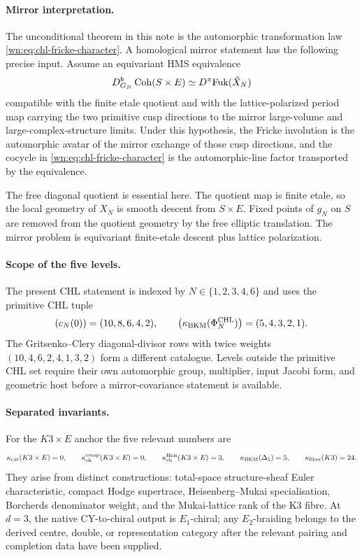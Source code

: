\paragraph{Mirror interpretation.}
The unconditional theorem in this note is the automorphic
transformation law \eqref{wn:eq:chl-fricke-character}.  A homological
mirror statement has the following precise input.  Assume an equivariant
HMS equivalence
\[
  D^b_{G_N}\operatorname{Coh}(S\times E)
  \simeq
  D^\pi\mathrm{Fuk}(\check X_N)
\]
compatible with the finite etale quotient and with the lattice-polarized
period map carrying the two primitive cusp directions to the mirror
large-volume and large-complex-structure limits.  Under this hypothesis,
the Fricke involution is the automorphic avatar of the mirror exchange
of those cusp directions, and the cocycle in
\eqref{wn:eq:chl-fricke-character} is the automorphic-line factor
transported by the equivalence.

The free diagonal quotient is essential here.  The quotient map is finite
etale, so the local geometry of \(X_N\) is smooth descent from
\(S\times E\).  Fixed points of \(g_N\) on \(S\) are removed from the
quotient geometry by the free elliptic translation.  The mirror problem
is equivariant finite-etale descent plus lattice polarization.

\paragraph{Scope of the five levels.}
The present CHL statement is indexed by \(N\in\{1,2,3,4,6\}\) and uses
the primitive CHL tuple
\[
  (c_N(0))=(10,8,6,4,2),\qquad
  \bigl(\kappa_{\mathrm{BKM}}(\Phi^{\mathrm{CHL}}_N)\bigr)=(5,4,3,2,1).
\]
The Gritsenko--Clery diagonal-divisor rows with twice weights
\((10,4,6,2,4,1,3,2)\) form a different catalogue.  Levels outside the
primitive CHL set require their own automorphic group, multiplier, input
Jacobi form, and geometric host before a mirror-covariance statement is
available.

\paragraph{Separated invariants.}
For the \(K3\times E\) anchor the five relevant numbers are
\[
  \kappa_{\mathrm{cat}}(K3\times E)=0,\qquad
  \kappa_{\mathrm{ch}}^{\mathrm{comp}}(K3\times E)=0,\qquad
  \kappa_{\mathrm{ch}}^{\mathrm{Heis}}(K3\times E)=3,\qquad
  \kappa_{\mathrm{BKM}}(\Delta_5)=5,\qquad
  \kappa_{\mathrm{fiber}}(K3)=24.
\]
They arise from distinct constructions: total-space structure-sheaf
Euler characteristic, compact Hodge supertrace, Heisenberg--Mukai
specialisation, Borcherds denominator weight, and the Mukai-lattice
rank of the K3 fibre.  At \(d=3\), the native CY-to-chiral output is
\(E_1\)-chiral; any \(E_2\)-braiding belongs to the derived centre,
double, or representation category after the relevant pairing and
completion data have been supplied.
